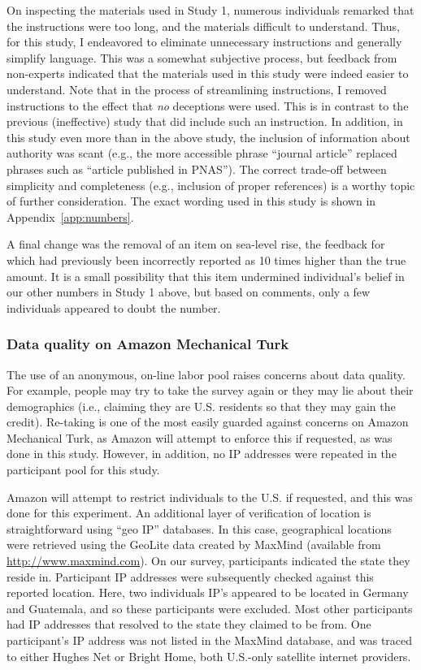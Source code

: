 On inspecting the materials used in Study 1, numerous individuals remarked that
the instructions were too long, and the materials difficult to understand. Thus,
for this study, I endeavored to eliminate unnecessary instructions and generally
simplify language. This was a somewhat subjective process, but feedback from
non-experts indicated that the materials used in this study were indeed easier
to understand. Note that in the process of streamlining instructions, I removed
instructions to the effect that \emph{no} deceptions were used. This is in
contrast to the previous (ineffective) study that did include such an
instruction.  In addition, in this study even more than in the above study, the
inclusion of information about authority was scant (e.g., the more accessible
phrase “journal article” replaced phrases such as “article published in PNAS”).
The correct trade-off between simplicity and completeness (e.g., inclusion of
proper references) is a worthy topic of further consideration.  The exact
wording used in this study is shown in Appendix~\ref{app:numbers}.

A final change was the removal of an item on sea-level rise, the feedback for
which had previously been incorrectly reported as 10 times higher than the true
amount. It is a small possibility that this item undermined individual's belief
in our other numbers in Study 1 above, but based on comments, only a few
individuals appeared to doubt the number.

\subsubsection{Data quality on Amazon Mechanical Turk}
\label{sec:mturk-problems}

The use of an anonymous, on-line labor pool raises concerns about data quality.
For example, people may try to take the survey again or they may lie about their
demographics (i.e., claiming they are U.S. residents so that they may gain the
credit). Re-taking is one of the most easily guarded against concerns on Amazon
Mechanical Turk, as Amazon will attempt to enforce this if requested, as was
done in this study. However, in addition, no IP addresses were repeated in the
participant pool for this study.

Amazon will attempt to restrict individuals to the U.S. if requested, and this
was done for this experiment. An additional layer of verification of location is
straightforward using “geo IP” databases. In this case, geographical locations
were retrieved using the GeoLite data created by MaxMind (available from
\url{http://www.maxmind.com}). On our survey, participants indicated the state
they reside in. Participant IP addresses were subsequently checked against this
reported location. Here, two individuals IP’s appeared to be located in Germany
and Guatemala, and so these participants were excluded. Most other
participants had IP addresses that resolved to the state they claimed to be
from. One participant’s IP address was not listed in the MaxMind database, and
was traced to either Hughes Net or Bright Home, both U.S.-only satellite
internet providers.

